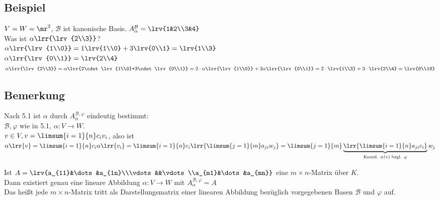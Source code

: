 \subsection{Beispiel}
	$V=W=\mr^2$, $\mathcal{B}$ ist kanonische Basis. $A_\alpha^{\mathcal{B}}=\lrv{1&2\\3&4}$\\
	Was ist $\alpha\lrr{\lrv{2\\3}}$?\\
	$\alpha\lrr{\lrv{1\\0}}=1\lrv{1\\0}+3\lrv{0\\1}=\lrv{1\\3}$\\
	$\alpha\lrr{\lrv{0\\1}}=\lrv{2\\4}$\\
	$\alpha\lrr{\lrv{2\\3}}=\alpha\lrr{2\cdot\lrv{1\\0}+3\cdot\lrv{0\\1}}=2\cdot\alpha\lrr{\lrv{1\\0}}+3\alpha\lrr{\lrv{0\\1}}=2\cdot\lrv{1\\3}+3\cdot\lrv{2\\4}=\lrv{8\\18}$
	
\subsection{Bemerkung}
		\item Nach 5.1 ist $\alpha$ durch $A_{\alpha}^{\mathcal{B}, \varphi}$ eindeutig bestimmt:\\
			$\mathcal{B},\varphi$ wie in 5.1, $\alpha:V\rightarrow W$.\\
			$v\in V, v=\limsum{i=1}{n}c_iv_i$, also ist\\
			$\alpha\lrr{v}=\limsum{i=1}{n}c_i\alpha\lrr{v_i}=\limsum{i=1}{n}c_i\lrr{\limsum{j=1}{m}a_{ji}w_j}=\limsum{j=1}{m}\underbrace{\lrr{\limsum{i=1}{n}a_{ji}c_i}}_{\mbox{\scriptsize Koord. }\scriptstyle \alpha(v)\mbox{\scriptsize \;bzgl. }\scriptstyle\varphi}w_j$
		\item Ist $A=\lrv{a_{11}&\dots&a_{1n}\\\vdots&&\vdots\\a_{m1}&\dots&a_{mn}}$ eine $m\times n$-Matrix über $K$.\\
			Dann existiert genau eine lineare Abbildung $\alpha:V\rightarrow W$ mit $A_{\alpha}^{\mathcal{B}, \varphi}=A$\\
			Das heißt jede $m\times n$-Matrix tritt als Darstellungsmatrix einer linearen Abbildung bezüglich vorgegebenen Basen $\mathcal{B}$ und $\varphi$ auf.
			
